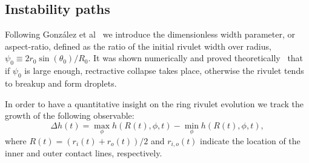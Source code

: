 \documentclass[twoside,twocolumn,9pt]{article}
\begin{document}
\subsection{Instability paths}\label{subsec:stability}

Following Gonz\'alez et al~\cite{gonzalezStabilityLiquidRing2013} we introduce the dimensionless width
parameter, or aspect-ratio, defined as the ratio of the initial rivulet width over radius, 
$\psi_0 \equiv 2r_0 \sin(\theta_0)/R_0$. It was shown numerically and proved theoretically~\cite{gonzalezStabilityLiquidRing2013,nguyenCompetitionCollapseBreakup2012}
 that if $\psi_0$ is large enough, rectractive collapse takes place, otherwise the rivulet tends to breakup 
 and form droplets.


In order to have a quantitative insight on the ring rivulet evolution we track the growth of the following 
observable:
\begin{equation}\label{eq:delta-h-measure}
       \Delta h(t) = \max_{\phi}h(R(t),\phi,t) - \min_{\phi}h(R(t),\phi,t),
\end{equation}
where $R(t) = (r_i(t)+r_o(t))/2$ and $r_{i,o}(t)$ indicate the location of the inner and outer contact lines, 
respectively. 
\end{document}
